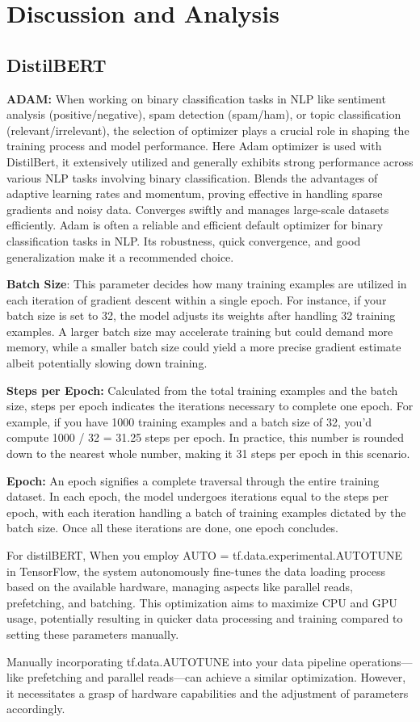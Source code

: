 \chapter{Discussion and Analysis}
\label{ch:evaluation}


\section{DistilBERT}

\textbf{ADAM:}
When working on binary classification tasks in NLP like sentiment analysis (positive/negative), spam detection (spam/ham), or topic classification (relevant/irrelevant), the selection of optimizer plays a crucial role in shaping the training process and model performance.
Here Adam optimizer is used with DistilBert, it extensively utilized and generally exhibits strong performance across various NLP tasks involving binary classification. Blends the advantages of adaptive learning rates and momentum, proving effective in handling sparse gradients and noisy data.
Converges swiftly and manages large-scale datasets efficiently.
Adam is often a reliable and efficient default optimizer for binary classification tasks in NLP. Its robustness, quick convergence, and good generalization make it a recommended choice.

\textbf{Batch Size}: This parameter decides how many training examples are utilized in each iteration of gradient descent within a single epoch. For instance, if your batch size is set to 32, the model adjusts its weights after handling 32 training examples. A larger batch size may accelerate training but could demand more memory, while a smaller batch size could yield a more precise gradient estimate albeit potentially slowing down training.

\textbf{Steps per Epoch:} Calculated from the total training examples and the batch size, steps per epoch indicates the iterations necessary to complete one epoch. For example, if you have 1000 training examples and a batch size of 32, you'd compute 1000 / 32 = 31.25 steps per epoch. In practice, this number is rounded down to the nearest whole number, making it 31 steps per epoch in this scenario.

\textbf{Epoch:} An epoch signifies a complete traversal through the entire training dataset. In each epoch, the model undergoes iterations equal to the steps per epoch, with each iteration handling a batch of training examples dictated by the batch size. Once all these iterations are done, one epoch concludes.

For distilBERT, When you employ AUTO = tf.data.experimental.AUTOTUNE in TensorFlow, the system autonomously fine-tunes the data loading process based on the available hardware, managing aspects like parallel reads, prefetching, and batching. This optimization aims to maximize CPU and GPU usage, potentially resulting in quicker data processing and training compared to setting these parameters manually.

Manually incorporating tf.data.AUTOTUNE into your data pipeline operations—like prefetching and parallel reads—can achieve a similar optimization. However, it necessitates a grasp of hardware capabilities and the adjustment of parameters accordingly.